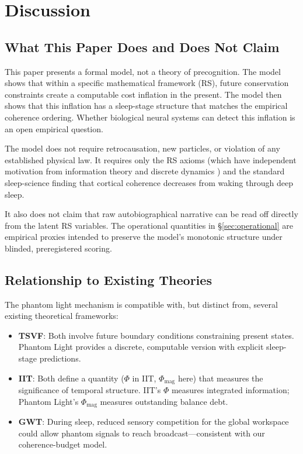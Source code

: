 \documentclass[11pt, a4paper]{article}
\theoremstyle{definition}
\theoremstyle{remark}
\begin{document}
\section{Discussion}\label{sec:discussion}

\subsection{What This Paper Does and Does Not Claim}

This paper presents a formal model, not a theory of precognition.
The model shows that within a specific mathematical framework (RS),
future conservation constraints create a computable cost inflation
in the present. The model then shows that this inflation has a
sleep-stage structure that matches the empirical coherence ordering.
Whether biological neural systems can detect this inflation is an
open empirical question.

The model does not require retrocausation, new particles, or
violation of any established physical law. It requires only the
RS axioms (which have independent motivation from information
theory and discrete dynamics \cite{RSAxioms2025,RSdalembert2026})
and the standard sleep-science finding that cortical coherence
decreases from waking through deep sleep.

It also does not claim that raw autobiographical narrative can be
read off directly from the latent RS variables. The operational
quantities in \S\ref{sec:operational} are empirical proxies intended
to preserve the model's monotonic structure under blinded,
preregistered scoring.

\subsection{Relationship to Existing Theories}

The phantom light mechanism is compatible with, but distinct from,
several existing theoretical frameworks:

\begin{itemize}
    \item \textbf{TSVF}: Both involve future boundary conditions
    constraining present states. Phantom Light provides a discrete,
    computable version with explicit sleep-stage predictions.
    \item \textbf{IIT}: Both define a quantity ($\Phi$ in IIT,
    $\Phi_{\mathrm{mag}}$ here) that measures the significance of
    temporal structure. IIT's $\Phi$ measures integrated information;
    Phantom Light's $\Phi_{\mathrm{mag}}$ measures outstanding
    balance debt.
    \item \textbf{GWT}: During sleep, reduced sensory competition
    for the global workspace could allow phantom signals to reach
    broadcast---consistent with our coherence-budget model.
\end{itemize}
\end{document}
